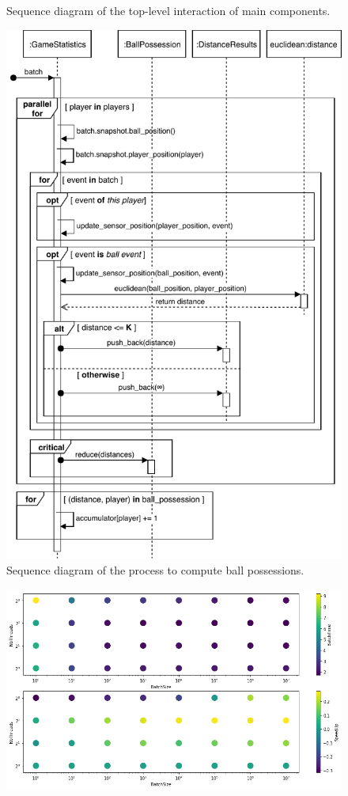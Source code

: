 \documentclass[a4paper, 11pt]{article}
\begin{document}
\begin{appendices}
\begin{figure}
    \caption{Sequence diagram of the top-level interaction of main components.}
    \label{fig:top_level_seq}
\end{figure}
\begin{figure}
    \centering
    \includegraphics[height=.95\textheight]{UML/accumulate_stats.pdf}
    \caption{Sequence diagram of the process to compute ball possessions.}
    \label{fig:accumulate_stats_seq}
\end{figure}
\begin{figure}
    \centering
    \includegraphics[width=1\textwidth]{Performance/speedup_analysis_7_1.png}

\end{figure}
\end{appendices}
\end{document}
